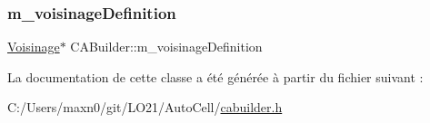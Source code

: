 \subsubsection{\texorpdfstring{m\+\_\+voisinage\+Definition}{m\_voisinageDefinition}}
{\footnotesize\ttfamily \mbox{\hyperlink{class_voisinage}{Voisinage}}$\ast$ C\+A\+Builder\+::m\+\_\+voisinage\+Definition\hspace{0.3cm}{\ttfamily [protected]}}



La documentation de cette classe a été générée à partir du fichier suivant \+:\begin{DoxyCompactItemize}
\item 
C\+:/\+Users/maxn0/git/\+L\+O21/\+Auto\+Cell/\mbox{\hyperlink{cabuilder_8h}{cabuilder.\+h}}\end{DoxyCompactItemize}
